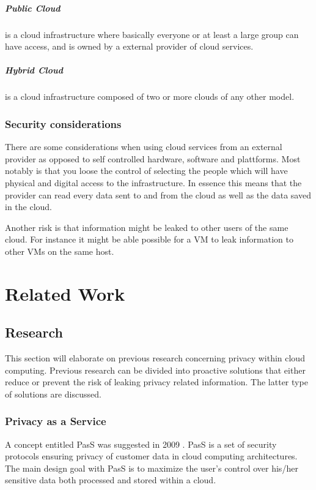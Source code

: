 \documentclass[pdftex,english,10pt,b5paper,twoside]{book}
\begin{document}
\paragraph{Public Cloud} is a cloud infrastructure where basically everyone or
at least a large group can have access, and is owned by a external provider of
cloud services.

\paragraph{Hybrid Cloud} is a cloud infrastructure composed of two or more
clouds of any other model.

\subsection{Security considerations}
There are some considerations when using cloud services from an external provider
as opposed to self controlled hardware, software and plattforms. Most notably
is that you loose the control of selecting the people which will have physical
and digital access to the infrastructure. In essence this means that the
provider can read every data sent to and from the cloud as well as the data
saved in the cloud.

Another risk is that information might be leaked to other users of the same
cloud. For instance it might be able possible for a \ac{VM} to leak information
to other \ac{VM}s on the same host.

\chapter{Related Work}

\section{Research}
This section will elaborate on previous research concerning privacy within cloud
computing. Previous research can be divided into proactive solutions that
either reduce or prevent the risk of leaking privacy related information. The
latter type of solutions are discussed.

\subsection{Privacy as a Service}
A concept entitled \ac{PasS} was suggested in 2009
\cite{PasS}. PasS is a set of security protocols ensuring privacy of customer
data in cloud computing architectures. The main design goal with PasS is to
maximize the user's control over his/her sensitive data both processed and stored
within a cloud.
\end{document}
